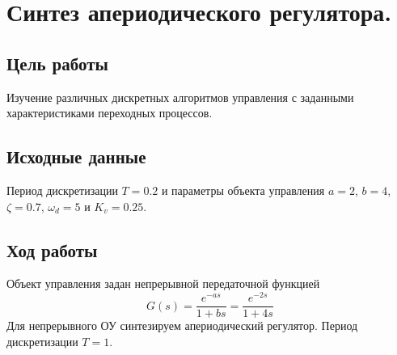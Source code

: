 \chapter{Синтез апериодического регулятора.}
\label{ch:chap1}

\section{Цель работы}
Изучение различных дискретных алгоритмов управления с заданными характеристиками переходных процессов.
\section{Исходные данные}
Период дискретизации $T = 0.2$ и параметры объекта управления $a = 2$, $b = 4$, $\zeta = 0.7$, $\omega_d = 5$ и $K_v=0.25$.

\section{Ход работы}
Объект управления задан непрерывной передаточной функцией
\begin{equation}
	G(s) = \frac{e^{-as}}{1+bs} = \frac{e^{-2s}}{1+4s}
\end{equation}
Для непрерывного ОУ синтезируем апериодический регулятор. Период дискретизации $T=1$.

